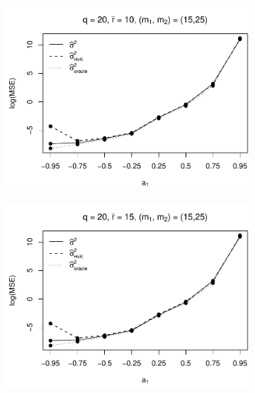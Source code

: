 \begin{figure}[p]
\begin{subfigure}[b]{0.45\textwidth}
\includegraphics[width=\textwidth]{Plots/Robustness/MSE_lrv_T=500_slope=1_(q,r,M1,M2)=(20,10,15,25).pdf}
\end{subfigure}
\hspace{0.25cm}
\begin{subfigure}[b]{0.45\textwidth}
\includegraphics[width=\textwidth]{Plots/Robustness/MSE_lrv_T=500_slope=1_(q,r,M1,M2)=(20,15,15,25).pdf}
\end{subfigure}


\end{figure}
